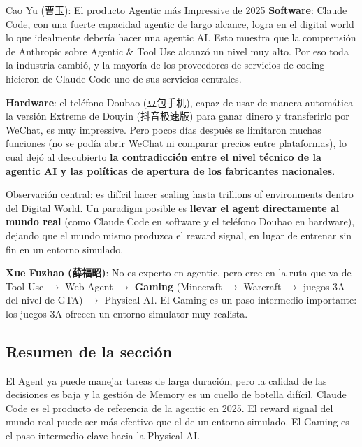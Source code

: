\begin{importantbox}{Cao Yu (曹玉): El producto Agentic más Impressive de 2025}
\textbf{Software}: Claude Code, con una fuerte capacidad agentic de largo alcance, logra en el digital world lo que idealmente debería hacer una agentic AI. Esto muestra que la comprensión de Anthropic sobre Agentic \& Tool Use alcanzó un nivel muy alto. Por eso toda la industria cambió, y la mayoría de los proveedores de servicios de coding hicieron de Claude Code uno de sus servicios centrales.

\textbf{Hardware}: el teléfono Doubao (豆包手机), capaz de usar de manera automática la versión Extreme de Douyin (抖音极速版) para ganar dinero y transferirlo por WeChat, es muy impressive. Pero pocos días después se limitaron muchas funciones (no se podía abrir WeChat ni comparar precios entre plataformas), lo cual dejó al descubierto \textbf{la contradicción entre el nivel técnico de la agentic AI y las políticas de apertura de los fabricantes nacionales}.

Observación central: es difícil hacer scaling hasta trillions of environments dentro del Digital World. Un paradigm posible es \textbf{llevar el agent directamente al mundo real} (como Claude Code en software y el teléfono Doubao en hardware), dejando que el mundo mismo produzca el reward signal, en lugar de entrenar sin fin en un entorno simulado.
\end{importantbox}

\textbf{Xue Fuzhao (薛福昭)}: No es experto en agentic, pero cree en la ruta que va de Tool Use $\to$ Web Agent $\to$ \textbf{Gaming} (Minecraft $\to$ Warcraft $\to$ juegos 3A del nivel de GTA) $\to$ Physical AI. El Gaming es un paso intermedio importante: los juegos 3A ofrecen un entorno simulator muy realista.

\subsection{Resumen de la sección}
El Agent ya puede manejar tareas de larga duración, pero la calidad de las decisiones es baja y la gestión de Memory es un cuello de botella difícil. Claude Code es el producto de referencia de la agentic en 2025. El reward signal del mundo real puede ser más efectivo que el de un entorno simulado. El Gaming es el paso intermedio clave hacia la Physical AI.

